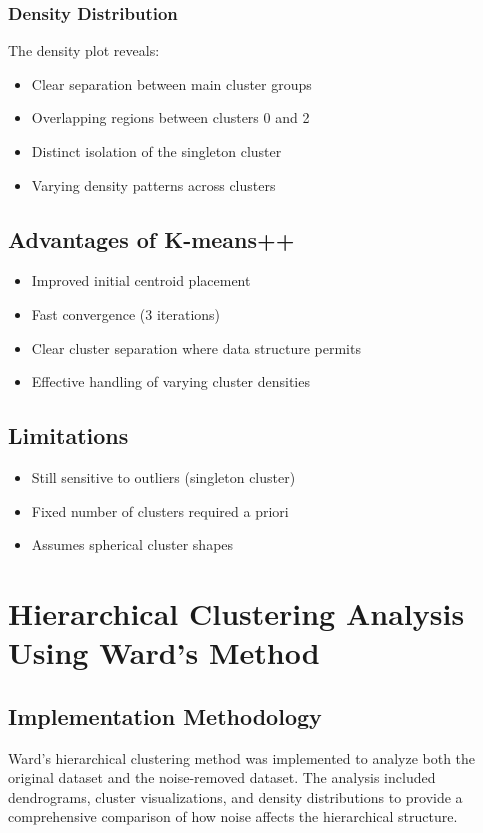 \documentclass[12pt]{article}
\begin{document}
\subsubsection{Density Distribution}
The density plot reveals:
\begin{itemize}
    \item Clear separation between main cluster groups
    \item Overlapping regions between clusters 0 and 2
    \item Distinct isolation of the singleton cluster
    \item Varying density patterns across clusters
\end{itemize}

\subsection{Advantages of K-means++}
\begin{itemize}
    \item Improved initial centroid placement
    \item Fast convergence (3 iterations)
    \item Clear cluster separation where data structure permits
    \item Effective handling of varying cluster densities
\end{itemize}

\subsection{Limitations}
\begin{itemize}
    \item Still sensitive to outliers (singleton cluster)
    \item Fixed number of clusters required a priori
    \item Assumes spherical cluster shapes
\end{itemize}

\section{Hierarchical Clustering Analysis Using Ward's Method}

\subsection{Implementation Methodology}
Ward's hierarchical clustering method was implemented to analyze both the original dataset and the noise-removed dataset. The analysis included dendrograms, cluster visualizations, and density distributions to provide a comprehensive comparison of how noise affects the hierarchical structure.
\end{document}
